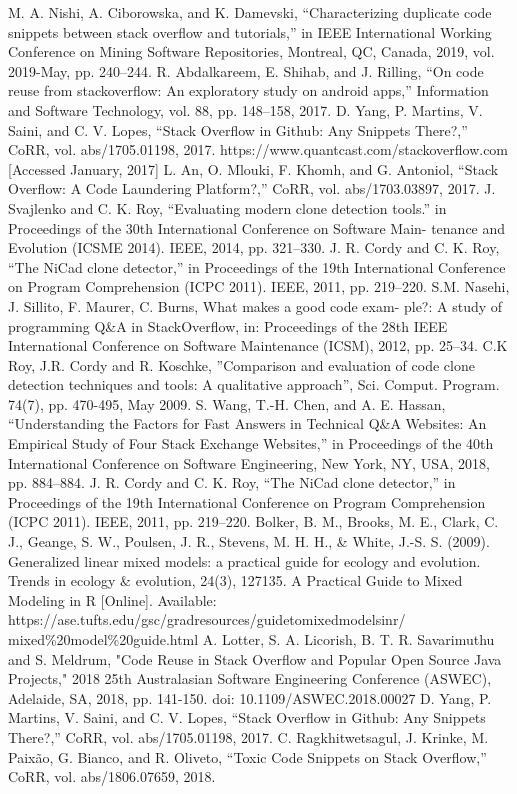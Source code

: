 \documentclass[conference]{IEEEtran}
\begin{document}
	
	\begin{thebibliography}{00}
		 M. A. Nishi, A. Ciborowska, and K. Damevski, “Characterizing duplicate code snippets between stack overflow and tutorials,” in IEEE International Working Conference on Mining Software Repositories, Montreal, QC, Canada, 2019, vol. 2019-May, pp. 240–244.
		 R. Abdalkareem, E. Shihab, and J. Rilling, “On code reuse from stackoverflow: An exploratory study on android apps,” Information and Software Technology, vol. 88, pp. 148–158, 2017.
		 D. Yang, P. Martins, V. Saini, and C. V. Lopes, “Stack Overflow in Github: Any Snippets There?,” CoRR, vol. abs/1705.01198, 2017.
		 https://www.quantcast.com/stackoverflow.com [Accessed January, 2017]
		 L. An, O. Mlouki, F. Khomh, and G. Antoniol, “Stack Overflow: A Code Laundering Platform?,” CoRR, vol. abs/1703.03897, 2017.
		 J. Svajlenko and C. K. Roy, “Evaluating modern clone detection tools.” in Proceedings of the 30th International Conference on Software Main- tenance and Evolution (ICSME 2014). IEEE, 2014, pp. 321–330.
		 J. R. Cordy and C. K. Roy, “The NiCad clone detector,” in Proceedings of the 19th International Conference on Program Comprehension (ICPC 2011). IEEE, 2011, pp. 219–220.
		 S.M. Nasehi, J. Sillito, F. Maurer, C. Burns, What makes a good code exam- ple?: A study of programming Q\&A in StackOverflow, in: Proceedings of the 28th IEEE International Conference on Software Maintenance (ICSM), 2012, pp. 25–34.
		 C.K Roy, J.R. Cordy and R. Koschke, ”Comparison and evaluation of code clone detection techniques and tools: A qualitative approach”, Sci. Comput. Program. 74(7), pp. 470-495, May 2009.
		 S. Wang, T.-H. Chen, and A. E. Hassan, “Understanding the Factors for Fast Answers in Technical Q\&A Websites: An Empirical Study of Four Stack Exchange Websites,” in Proceedings of the 40th International Conference on Software Engineering, New York, NY, USA, 2018, pp. 884–884.
		 J. R. Cordy and C. K. Roy, “The NiCad clone detector,” in Proceedings of the 19th International Conference on Program Comprehension (ICPC 2011). IEEE, 2011, pp. 219–220.
		 Bolker, B. M., Brooks, M. E., Clark, C. J., Geange, S. W., Poulsen, J. R., Stevens, M. H. H., \& White, J.-S. S. (2009). Generalized linear mixed models: a practical guide for ecology and evolution. Trends in ecology \& evolution, 24(3), 127135.
		 A Practical Guide to Mixed Modeling in R [Online]. Available:  https://ase.tufts.edu/gsc/gradresources/guidetomixedmodelsinr/ mixed\%20model\%20guide.html
		 A. Lotter, S. A. Licorish, B. T. R. Savarimuthu and S. Meldrum, "Code Reuse in Stack Overflow and Popular Open Source Java Projects," 2018 25th Australasian Software Engineering Conference (ASWEC), Adelaide, SA, 2018, pp. 141-150. doi: 10.1109/ASWEC.2018.00027
		 D. Yang, P. Martins, V. Saini, and C. V. Lopes, “Stack Overflow in Github: Any Snippets There?,” CoRR, vol. abs/1705.01198, 2017.
		 C. Ragkhitwetsagul, J. Krinke, M. Paixão, G. Bianco, and R. Oliveto, “Toxic Code Snippets on Stack Overflow,” CoRR, vol. abs/1806.07659, 2018.
		
		
		
	\end{thebibliography}
	
	
\end{document}
